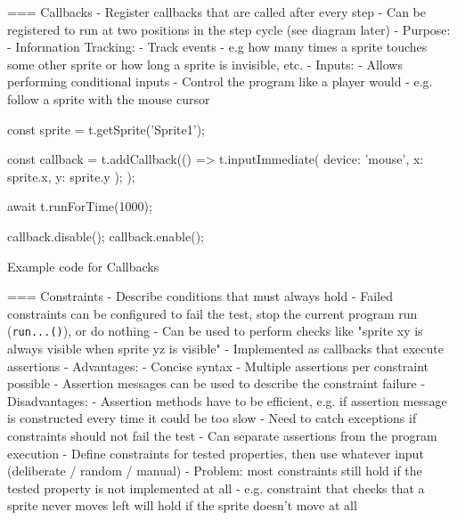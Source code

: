 === Callbacks
- Register callbacks that are called after every step
- Can be registered to run at two positions in the step cycle (see diagram later)
- Purpose:
    - Information Tracking:
        - Track events
        - e.g how many times a sprite touches some other sprite
              or how long a sprite is invisible, etc.
    - Inputs:
        - Allows performing conditional inputs
        - Control the program like a player would
        - e.g. follow a sprite with the mouse cursor

\begin{listing}[ht]
    \centering
    \begin{javascriptcode}
        const sprite = t.getSprite('Sprite1');

        const callback = t.addCallback(() => {
            t.inputImmediate({
                device: 'mouse',
                x: sprite.x,
                y: sprite.y
            });
        });

        await t.runForTime(1000);

        callback.disable();
        callback.enable();
    \end{javascriptcode}
    \vspace{-\bigskipamount}
    \caption{Example code for Callbacks}
    \label{fig:example_code_for_callbacks}
\end{listing}


=== Constraints
- Describe conditions that must always hold
- Failed constraints can be configured to fail the test, stop the current program run (\texttt{run...()}), or do nothing
- Can be used to perform checks like "sprite xy is always visible when sprite yz is visible"
- Implemented as callbacks that execute assertions
    - Advantages:
        - Concise syntax
        - Multiple assertions per constraint possible
        - Assertion messages can be used to describe the constraint failure
    - Disadvantages:
        - Assertion methods have to be efficient, e.g. if assertion message is constructed every time it could be too slow
        - Need to catch exceptions if constraints should not fail the test
- Can separate assertions from the program execution
    - Define constraints for tested properties, then use whatever input (deliberate / random / manual)
    - Problem: most constraints still hold if the tested property is not implemented at all
        - e.g. constraint that checks that a sprite never moves left will hold if the sprite doesn't move at all

